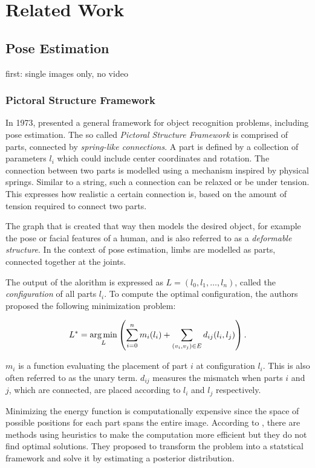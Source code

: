 \chapter{Related Work}

\section{Pose Estimation}
first: single images only, no video
\subsection{Pictoral Structure Framework}
In 1973, \cite{fischler_representation_1973} presented a general framework for object recognition problems, including pose estimation.
The so called \textit{Pictoral Structure Framework} is comprised of parts, connected by \textit{spring-like connections}.
A part is defined by a collection of parameters $l_i$ which could include center coordinates and rotation.
The connection between two parts is modelled using a mechanism inspired by physical springs.
Similar to a string, such a connection can be relaxed or be under tension.
This expresses how realistic a certain connection is, based on the amount of tension required to connect two parts.

The graph that is created that way then models the desired object, for example the pose or facial features of a human, and is also referred to as a \textit{deformable structure}.
In the context of pose estimation, limbs are modelled as parts, connected together at the joints.

The output of the alorithm is expressed as $L = (l_0, l_1, \dots, l_n)$, called the \textit{configuration} of all parts $l_i$.
To compute the optimal configuration, the authors proposed the following minimization problem:

\begin{equation}
    \label{eq:energy-minimization}
    L^* = \operatorname*{arg\,min}_L \left(\sum_{i=0}^n m_i(l_i) + \sum_{(v_i, v_j) \in E} d_{ij}(l_i, l_j)\right).
\end{equation}

$m_i$ is a function evaluating the placement of part $i$ at configuration $l_i$.
This is also often referred to as the unary term.
$d_{ij}$ measures the mismatch when parts $i$ and $j$, which are connected, are placed according to $l_i$ and $l_j$ respectively.

Minimizing the energy function is computationally expensive since the space of possible positions for each part spans the entire image.
According to \cite{felzenszwalb_pictorial_2005}, there are methods using heuristics to make the computation more efficient but they do not find optimal solutions.
They proposed to transform the problem into a statstical framework and solve it by estimating a posterior distribution.

